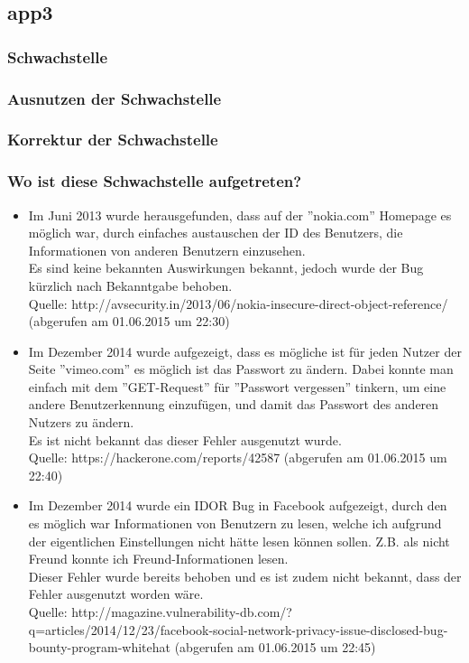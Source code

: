 \documentclass[12pt,a4paper,titlepage,oneside]{scrartcl}
\begin{document}

\subsection{app3}

\subsubsection{Schwachstelle}

\subsubsection{Ausnutzen der Schwachstelle}

\subsubsection{Korrektur der Schwachstelle}

\subsubsection{Wo ist diese Schwachstelle aufgetreten?}

\begin{itemize}
	\item Im Juni 2013 wurde herausgefunden, dass auf der ''nokia.com'' Homepage es möglich war, durch einfaches austauschen der ID des Benutzers, die Informationen von anderen Benutzern einzusehen. \\
	Es sind keine bekannten Auswirkungen bekannt, jedoch wurde der Bug kürzlich nach Bekanntgabe behoben. \\
	Quelle: http://avsecurity.in/2013/06/nokia-insecure-direct-object-reference/ (abgerufen am 01.06.2015 um 22:30)
	\item Im Dezember 2014 wurde aufgezeigt, dass es mögliche ist für jeden Nutzer der Seite ''vimeo.com'' es möglich ist das Passwort zu ändern. Dabei konnte man einfach mit dem ''GET-Request'' für ''Passwort vergessen'' tinkern, um eine andere Benutzerkennung einzufügen, und damit das Passwort des anderen Nutzers zu ändern. \\
	Es ist nicht bekannt das dieser Fehler ausgenutzt wurde. \\
	Quelle: https://hackerone.com/reports/42587 (abgerufen am 01.06.2015 um 22:40)
	\item Im Dezember 2014 wurde ein IDOR Bug in Facebook aufgezeigt, durch den es möglich war Informationen von Benutzern zu lesen, welche ich aufgrund der eigentlichen Einstellungen nicht hätte lesen können sollen. Z.B. als nicht Freund konnte ich Freund-Informationen lesen. \\
	Dieser Fehler wurde bereits behoben und es ist zudem nicht bekannt, dass der Fehler ausgenutzt worden wäre. \\
	Quelle: http://magazine.vulnerability-db.com/?q=articles/2014/12/23/facebook-social-network-privacy-issue-disclosed-bug-bounty-program-whitehat (abgerufen am 01.06.2015 um 22:45)
\end{itemize}

%
%
\end{document}
